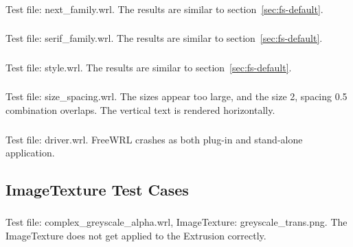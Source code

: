 \subsubsection{\FSC}
Test file: next\_family.wrl.\newline
The results are similar to section~\ref{sec:fs-default}.

\subsubsection{\FSD}
Test file: serif\_family.wrl.\newline
The results are similar to section~\ref{sec:fs-default}.

\subsubsection{\FSE}
Test file: style.wrl.\newline
The results are similar to section~\ref{sec:fs-default}.

\subsubsection{\FSF}
Test file: size\_spacing.wrl.\newline
The sizes appear too large, and the size 2, spacing 0.5 combination overlaps.
The vertical text is rendered horizontally.  

\subsubsection{\FSG}
Test file: driver.wrl.\newline
FreeWRL crashes as both plug-in and stand-alone application.

\subsection{ImageTexture Test Cases}

\setcounter{subsubsection}{21}
\subsubsection{\ITVa\ITVb}
\label{sec:png-complex-greyscale}
Test file: complex\_greyscale\_alpha.wrl, ImageTexture: greyscale\_trans.png.\newline
The ImageTexture does not get applied to the Extrusion correctly.

